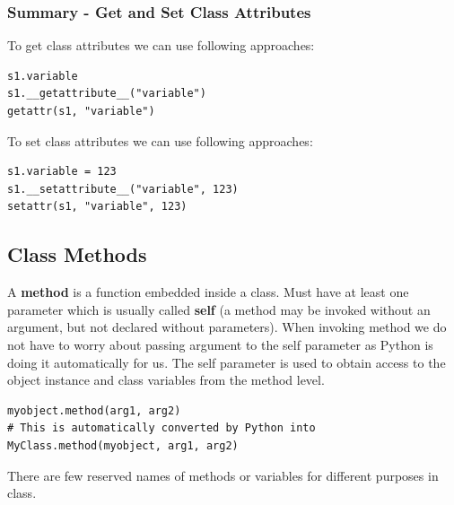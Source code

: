\documentclass{article}
\begin{document}
\subsubsection{Summary - Get and Set Class Attributes}
To get class attributes we can use following approaches:
\begin{lstlisting}[style=pystyle]
s1.variable
s1.__getattribute__("variable")
getattr(s1, "variable")
\end{lstlisting}
To set class attributes we can use following approaches:
\begin{lstlisting}[style=pystyle]
s1.variable = 123
s1.__setattribute__("variable", 123)
setattr(s1, "variable", 123)
\end{lstlisting}


\subsection{Class Methods}
A \textbf{method} is a function embedded inside a class. Must have at least one parameter which is usually called \textbf{self} (a method may be invoked without an argument, but not declared without parameters). When invoking method we do not have to worry about passing argument to the self parameter as Python is doing it automatically for us. The self parameter is used to obtain access to the object instance and class variables from the method level.
\begin{lstlisting}[style=pystyle]
myobject.method(arg1, arg2)
# This is automatically converted by Python into
MyClass.method(myobject, arg1, arg2)
\end{lstlisting}
There are few reserved names of methods or variables for different purposes in class.
 
\end{document}
